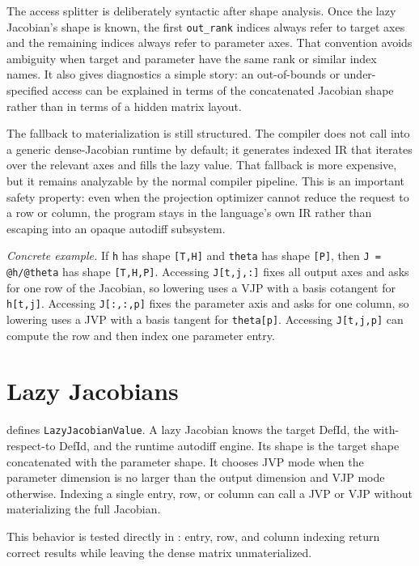 The access splitter is deliberately syntactic after shape analysis. Once the
lazy Jacobian's shape is known, the first \texttt{out\_rank} indices always
refer to target axes and the remaining indices always refer to parameter axes.
That convention avoids ambiguity when target and parameter have the same rank or
similar index names. It also gives diagnostics a simple story: an out-of-bounds
or under-specified access can be explained in terms of the concatenated
Jacobian shape rather than in terms of a hidden matrix layout.

The fallback to materialization is still structured. The compiler does not call
into a generic dense-Jacobian runtime by default; it generates indexed IR that
iterates over the relevant axes and fills the lazy value. That fallback is more
expensive, but it remains analyzable by the normal compiler pipeline. This is an
important safety property: even when the projection optimizer cannot reduce the
request to a row or column, the program stays in the language's own IR rather
than escaping into an opaque autodiff subsystem.

\textit{Concrete example.} If \texttt{h} has shape \texttt{[T,H]} and
\texttt{theta} has shape \texttt{[P]}, then \texttt{J = @h/@theta} has shape
\texttt{[T,H,P]}. Accessing \texttt{J[t,j,:]} fixes all output axes and asks
for one row of the Jacobian, so lowering uses a VJP with a basis cotangent for
\texttt{h[t,j]}. Accessing \texttt{J[:,:,p]} fixes the parameter axis and asks
for one column, so lowering uses a JVP with a basis tangent for
\texttt{theta[p]}. Accessing \texttt{J[t,j,p]} can compute the row and then
index one parameter entry.

\section{Lazy Jacobians}

 defines
\texttt{LazyJacobianValue}. A lazy Jacobian knows the target DefId, the
with-respect-to DefId, and the runtime autodiff engine. Its shape is the target
shape concatenated with the parameter shape. It chooses JVP mode when the
parameter dimension is no larger than the output dimension and VJP mode
otherwise. Indexing a single entry, row, or column can call a JVP or VJP without
materializing the full Jacobian.

This behavior is tested directly in :
entry, row, and column indexing return correct results while leaving the dense
matrix unmaterialized.


